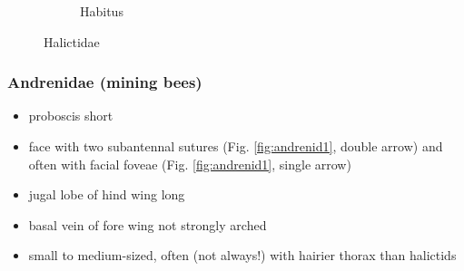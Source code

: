 \documentclass[letterpaper, 11pt]{article}
\begin{document}
\begin{figure}[ht!]
\begin{subfigure}[ht!]{0.4\textwidth}
        \caption{Habitus \citep[][Fig. 118]{goulet1993hymenoptera}}
        \label{fig:halict2}
    \end{subfigure}
    \caption{Halictidae}\label{fig:halictidae}
\end{figure}

\subsubsection{Andrenidae (mining bees)}
\begin{itemize}
\item proboscis short
\item face with two subantennal sutures (Fig. \ref{fig:andrenid1}, double arrow) and often with facial foveae (Fig. \ref{fig:andrenid1}, single arrow)
\item jugal lobe of hind wing long
\item basal vein of fore wing not strongly arched
\item small to medium-sized, often (not always!) with hairier thorax than halictids
\end{itemize}
\end{document}
